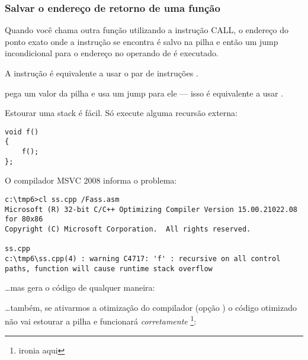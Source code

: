\subsubsection{Salvar o endereço de retorno de uma função}


Quando você chama outra função utilizando a instrução CALL, o endereço do ponto exato onde a 
instrução \CALL se encontra é salvo na pilha e então um jump incondicional para o endereço no operando de \CALL é executado.

A instrução \CALL é equivalente a usar o par de instruções .

\RET pega um valor da pilha e usa um jump para ele --- isso é equivalente a usar .

\myindex{\Stack!\MLStackOverflow}
\myindex{\Recursion}
Estourar uma stack é fácil. Só execute alguma recursão externa:

\begin{lstlisting}[style=customc]
void f()
{
	f();
};
\end{lstlisting}

O compilador MSVC 2008 informa o problema:

\begin{lstlisting}
c:\tmp6>cl ss.cpp /Fass.asm
Microsoft (R) 32-bit C/C++ Optimizing Compiler Version 15.00.21022.08 for 80x86
Copyright (C) Microsoft Corporation.  All rights reserved.

ss.cpp
c:\tmp6\ss.cpp(4) : warning C4717: 'f' : recursive on all control paths, function will cause runtime stack overflow
\end{lstlisting}

\dots mas gera o código de qualquer maneira:



\dots também, se ativarmos a otimização do compilador (opção ) 
o código otimizado não vai estourar a pilha e funcionará \emph{corretamente} \footnote{ironia aqui}:



\PTBRph{}

